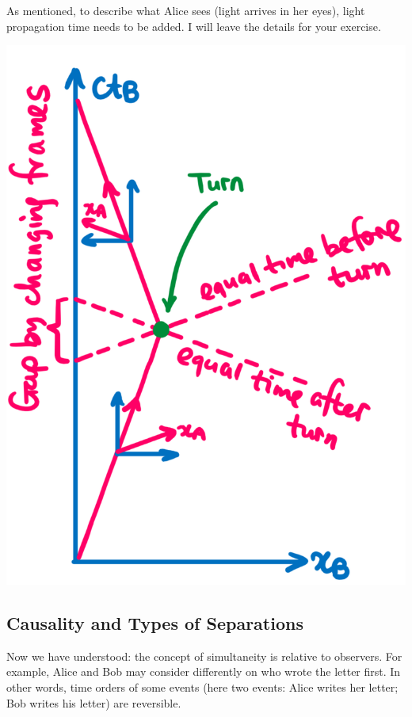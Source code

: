 {\begin{minipage}
		As mentioned, to describe what Alice sees (light arrives in her eyes), light propagation time needs to be added. I will leave the details for your exercise.
	\end{minipage}
	\hspace{0.01\textwidth}
	\begin{minipage}
		{0.3\textwidth}
		\includegraphics[width=\textwidth]{same_time_twin}
	\end{minipage}
}

\subsection{Causality and Types of Separations}

Now we have understood: the concept of simultaneity is relative to observers. For example, Alice and Bob may consider differently on who wrote the letter first. In other words, time orders of some events (here two events: Alice writes her letter; Bob writes his letter) are reversible. 

